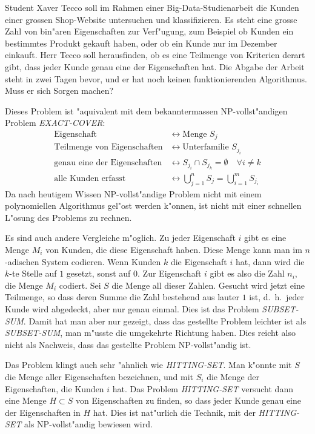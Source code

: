 Student Xaver Tecco soll im Rahmen einer Big-Data-Studienarbeit die 
Kunden einer grossen Shop-Website untersuchen und klassifizieren.
Es steht eine grosse Zahl von bin"aren Eigenschaften zur Verf"ugung,
zum Beispiel ob Kunden ein bestimmtes Produkt gekauft haben, oder
ob ein Kunde nur im Dezember einkauft.
Herr Tecco soll herausfinden, ob es eine Teilmenge von Kriterien derart
gibt, dass jeder Kunde genau eine der Eigenschaften hat.
Die Abgabe der Arbeit steht in zwei Tagen bevor, und er hat noch keinen
funktionierenden Algorithmus.
Muss er sich Sorgen machen?

\begin{loesung}
Dieses Problem ist "aquivalent mit dem bekanntermassen NP-vollst"andigen
Problem \textsl{EXACT-COVER}:
\begin{align*}
\text{Eigenschaft}&\leftrightarrow \text{Menge $S_j$}\\
\text{Teilmenge von Eigenschaften}&\leftrightarrow \text{Unterfamilie $S_{j_i}$}\\
\text{genau eine der Eigenschaften}&\leftrightarrow S_{j_i}\cap S_{j_k}=\emptyset\quad\forall i\ne k\\
\text{alle Kunden erfasst}&\leftrightarrow \bigcup_{j=1}^nS_j=\bigcup_{i=1}^m S_{j_i}
\end{align*}
Da nach heutigem Wissen NP-vollst"andige Problem nicht mit einem polynomiellen
Algorithmus gel"ost werden k"onnen, ist nicht mit einer schnellen L"osung
des Problems zu rechnen.

Es sind auch andere Vergleiche m"oglich.
Zu jeder Eigenschaft $i$ gibt es eine Menge $M_i$ von Kunden, die diese
Eigenschaft haben.
Diese Menge kann man im $n$-adischen System codieren.
Wenn Kunden $k$ die Eigenschaft $i$ hat, dann wird die $k$-te Stelle
auf $1$ gesetzt, sonst auf $0$.
Zur Eigenschaft $i$ gibt es also die Zahl $n_i$, die Menge $M_i$
codiert.
Sei $S$ die Menge all dieser Zahlen.
Gesucht wird jetzt eine Teilmenge, so dass deren Summe die Zahl
bestehend aus lauter $1$ ist, d.~h.~jeder Kunde wird abgedeckt, aber
nur genau einmal.
Dies ist das Problem \textsl{SUBSET-SUM}.
Damit hat man aber nur gezeigt, dass das gestellte Problem leichter ist
als \textsl{SUBSET-SUM}, man m"usste die umgekehrte Richtung haben.
Dies reicht also nicht als Nachweis, dass das gestellte Problem
NP-vollst"andig ist.

Das Problem klingt auch sehr "ahnlich wie \textsl{HITTING-SET}.
Man k"onnte mit $S$ die Menge aller Eigenschaften bezeichnen,
und mit $S_i$ die Menge der Eigenschaften, die Kunden $i$ hat.
Das Problem \textsl{HITTING-SET} versucht dann eine Menge $H\subset S$
von Eigenschaften zu finden, so dass jeder Kunde genau eine der
Eigenschaften in $H$ hat.
Dies ist nat"urlich die Technik, mit der \textsl{HITTING-SET}
als NP-vollst"andig bewiesen wird.
\end{loesung}

